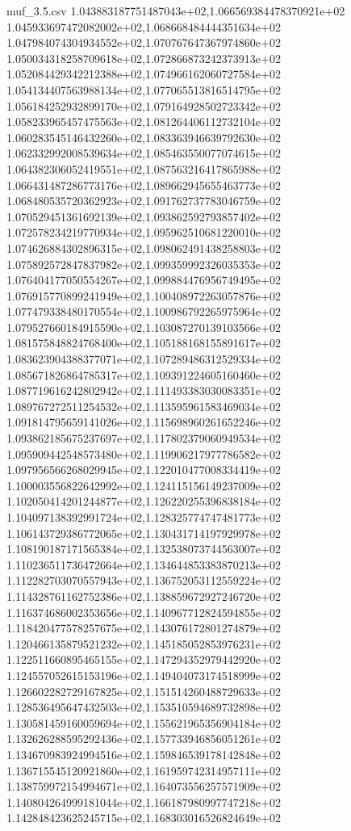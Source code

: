 \begin{filecontents*}{muf_3.5.csv}
1.043883187751487043e+02,1.066569384478370921e+02
1.045933697472082002e+02,1.068668484444351634e+02
1.047984074304934552e+02,1.070767647367974860e+02
1.050034318258709618e+02,1.072866873242373913e+02
1.052084429342212388e+02,1.074966162060727584e+02
1.054134407563988134e+02,1.077065513816514795e+02
1.056184252932899170e+02,1.079164928502723342e+02
1.058233965457475563e+02,1.081264406112732104e+02
1.060283545146432260e+02,1.083363946639792630e+02
1.062332992008539634e+02,1.085463550077074615e+02
1.064382306052419551e+02,1.087563216417865988e+02
1.066431487286773176e+02,1.089662945655463773e+02
1.068480535720362923e+02,1.091762737783046759e+02
1.070529451361692139e+02,1.093862592793857402e+02
1.072578234219770934e+02,1.095962510681220010e+02
1.074626884302896315e+02,1.098062491438258803e+02
1.075892572847837982e+02,1.099359992326035353e+02
1.076404177050554267e+02,1.099884476956749495e+02
1.076915770899241949e+02,1.100408972263057876e+02
1.077479338480170554e+02,1.100986792265975964e+02
1.079527660184915590e+02,1.103087270139103566e+02
1.081575848824768400e+02,1.105188168155891617e+02
1.083623904388377071e+02,1.107289486312529334e+02
1.085671826864785317e+02,1.109391224605160460e+02
1.087719616242802942e+02,1.111493383030083351e+02
1.089767272511254532e+02,1.113595961583469034e+02
1.091814795659141026e+02,1.115698960261652246e+02
1.093862185675237697e+02,1.117802379060949534e+02
1.095909442548573480e+02,1.119906217977786582e+02
1.097956566268029945e+02,1.122010477008334419e+02
1.100003556822642992e+02,1.124115156149237009e+02
1.102050414201244877e+02,1.126220255396838184e+02
1.104097138392991724e+02,1.128325774747481773e+02
1.106143729386772065e+02,1.130431714197929978e+02
1.108190187171565384e+02,1.132538073744563007e+02
1.110236511736472664e+02,1.134644853383870213e+02
1.112282703070557943e+02,1.136752053112559224e+02
1.114328761162752386e+02,1.138859672927246720e+02
1.116374686002353656e+02,1.140967712824594855e+02
1.118420477578257675e+02,1.143076172801274879e+02
1.120466135879521232e+02,1.145185052853976231e+02
1.122511660895465155e+02,1.147294352979442920e+02
1.124557052615153196e+02,1.149404073174518999e+02
1.126602282729167825e+02,1.151514260488729633e+02
1.128536495647432503e+02,1.153510594689732898e+02
1.130581459160059694e+02,1.155621965356904184e+02
1.132626288595292436e+02,1.157733946856051261e+02
1.134670983924994516e+02,1.159846539178142848e+02
1.136715545120921860e+02,1.161959742314957111e+02
1.138759972154994671e+02,1.164073556257571909e+02
1.140804264999181044e+02,1.166187980997747218e+02
1.142848423625245715e+02,1.168303016526824649e+02

\end{filecontents*}
